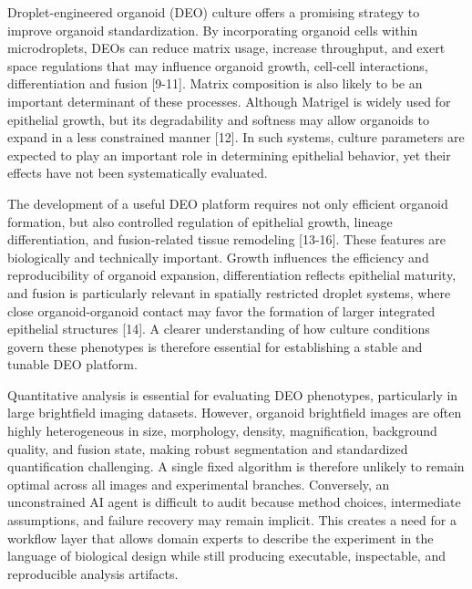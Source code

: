 \documentclass[
]{article}
\begin{document}
Droplet-engineered organoid (DEO) culture offers a promising strategy to improve organoid standardization. By incorporating organoid cells within microdroplets, DEOs can reduce matrix usage, increase throughput, and exert space regulations that may influence organoid growth, cell-cell interactions, differentiation and fusion {[}9-11{]}. Matrix composition is also likely to be an important determinant of these processes. Although Matrigel is widely used for epithelial growth, but its degradability and softness may allow organoids to expand in a less constrained manner {[}12{]}. In such systems, culture parameters are expected to play an important role in determining epithelial behavior, yet their effects have not been systematically evaluated.

The development of a useful DEO platform requires not only efficient organoid formation, but also controlled regulation of epithelial growth, lineage differentiation, and fusion-related tissue remodeling {[}13-16{]}. These features are biologically and technically important. Growth influences the efficiency and reproducibility of organoid expansion, differentiation reflects epithelial maturity, and fusion is particularly relevant in spatially restricted droplet systems, where close organoid-organoid contact may favor the formation of larger integrated epithelial structures {[}14{]}. A clearer understanding of how culture conditions govern these phenotypes is therefore essential for establishing a stable and tunable DEO platform.

Quantitative analysis is essential for evaluating DEO phenotypes, particularly in large brightfield imaging datasets. However, organoid brightfield images are often highly heterogeneous in size, morphology, density, magnification, background quality, and fusion state, making robust segmentation and standardized quantification challenging. A single fixed algorithm is therefore unlikely to remain optimal across all images and experimental branches. Conversely, an unconstrained AI agent is difficult to audit because method choices, intermediate assumptions, and failure recovery may remain implicit. This creates a need for a workflow layer that allows domain experts to describe the experiment in the language of biological design while still producing executable, inspectable, and reproducible analysis artifacts.
\end{document}
